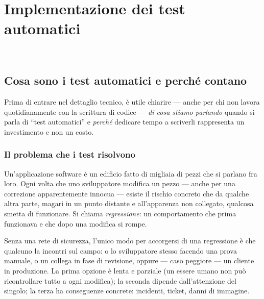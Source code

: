 \chapter{Implementazione dei test automatici}
\label{cap:test-implementazione}

\\

\section{Cosa sono i test automatici e perché contano}

Prima di entrare nel dettaglio tecnico, è utile chiarire — anche per chi non lavora quotidianamente con la scrittura di codice — \emph{di cosa stiamo parlando} quando si parla di ``test automatici'' e \emph{perché} dedicare tempo a scriverli rappresenta un investimento e non un costo.

\subsection{Il problema che i test risolvono}

Un'applicazione software è un edificio fatto di migliaia di pezzi che si parlano fra loro. Ogni volta che uno sviluppatore modifica un pezzo — anche per una correzione apparentemente innocua — esiste il rischio concreto che da qualche altra parte, magari in un punto distante e all'apparenza non collegato, qualcosa smetta di funzionare. Si chiama \emph{regressione}: un comportamento che prima funzionava e che dopo una modifica si rompe.

Senza una rete di sicurezza, l'unico modo per accorgersi di una regressione è che qualcuno la incontri sul campo: o lo sviluppatore stesso facendo una prova manuale, o un collega in fase di revisione, oppure — caso peggiore — un cliente in produzione. La prima opzione è lenta e parziale (un essere umano non può ricontrollare tutto a ogni modifica); la seconda dipende dall'attenzione del singolo; la terza ha conseguenze concrete: incidenti, ticket, danni di immagine.

